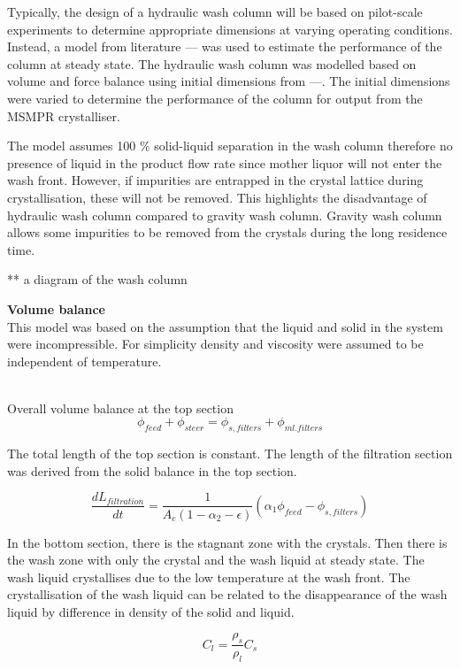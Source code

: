 Typically, the design of a hydraulic wash column will be based on pilot-scale experiments to determine appropriate dimensions at varying operating conditions. Instead, a  model from literature --- was used to estimate the performance of the column at steady state. The hydraulic wash column was modelled based on volume and force balance using initial dimensions from ---. The initial dimensions were varied to determine the performance of the column for output from the MSMPR crystalliser. 

The model assumes 100 \% solid-liquid separation in the wash column therefore no presence of liquid in the product flow rate since mother liquor will not enter the wash front. However, if impurities are entrapped in the crystal lattice during crystallisation, these will not be removed. This highlights the disadvantage of hydraulic wash column compared to gravity wash column. Gravity wash column allows some impurities to be removed from the crystals during the long residence time. 

** a diagram of the wash column

\textbf{Volume balance} 
\\This model was based on the assumption that the liquid and solid in the system were incompressible. For simplicity density and viscosity were assumed to be independent of temperature. 

\\Overall volume balance at the top section 
\begin{equation}
\phi_{feed}+\phi_{steer}=\phi_{s,filters}+\phi_{ml.filters}
\end{equation}

The total length of the top section is constant. The length of the filtration section was derived from the solid balance in the top section. 

\begin{equation}
\frac{dL_{filtration}}{dt} = \frac{1}{A_c(1-\alpha_2-\epsilon)}(\alpha_1\phi_{feed}-\phi_{s,filters})
\end{equation}

In the bottom section, there is the stagnant zone with the crystals. Then there is the wash zone with only the crystal and the wash liquid at steady state. The wash liquid crystallises due to the low temperature at the wash front. The crystallisation of the wash liquid can be related to the disappearance of the wash liquid by difference in density of the solid and liquid.

\begin{equation}
C_l= \frac{\rho_s}{\rho_l}C_s
\end{equation}

